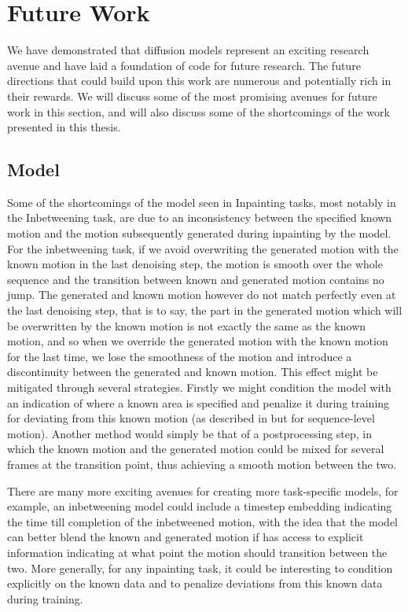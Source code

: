 \section{Future Work}
\label{sec:diffusion_future_work}

We have demonstrated that diffusion models represent an exciting research avenue and have laid a foundation of code for future research. The future directions that could build upon this work are numerous and potentially rich in their rewards. We will discuss some of the most promising avenues for future work in this section, and will also discuss some of the shortcomings of the work presented in this thesis.

\subsection{Model}
Some of the shortcomings of the model seen in Inpainting tasks, most notably in the Inbetweening task, are due to an inconsistency between the specified known motion and the motion subsequently generated during inpainting by the model. For the inbetweening task, if we avoid overwriting the generated motion with the known motion in the last denoising step, the motion is smooth over the whole sequence and the transition between known and generated motion contains no jump. The generated and known motion however do not match perfectly even at the last denoising step, that is to say, the part in the generated motion which will be overwritten by the known motion is not exactly the same as the known motion, and so when we override the generated motion with the known motion for the last time, we lose the smoothness of the motion and introduce a discontinuity between the generated and known motion. This effect might be mitigated through several strategies. Firstly we might condition the model with an indication of where a known area is specified and penalize it during training for deviating from this known motion (as described in  but for sequence-level motion). Another method would simply be that of a postprocessing step, in which the known motion and the generated motion could be mixed for several frames at the transition point, thus achieving a smooth motion between the two.

There are many more exciting avenues for creating more task-specific models, for example, an inbetweening model could include a timestep embedding indicating the time till completion of the inbetweened motion, with the idea that the model can better blend the known and generated motion if has access to explicit information indicating at what point the motion should transition between the two. More generally, for any inpainting task, it could be interesting to condition explicitly on the known data and to penalize deviations from this known data during training.

